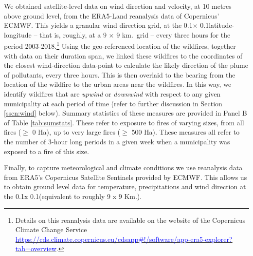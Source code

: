 \documentclass[11pt]{article}
\begin{document}
\begin{spacing}{1.5}
We obtained satellite-level data on wind direction and velocity, at 10 metres above ground level, from the ERA5-Land reanalysis data of Copernicus' ECMWF. This yields a granular wind direction grid, at the 0.1\textdegree $\times$ 0.1\textdegree latitude-longitude -- that is, roughly, at a 9 $\times$ 9 km.\ grid -- every three hours for the period 2003-2018.\footnote{Details on this reanalysis data are available on the website of the Copernicus Climate Change Service \hyperlink{https://cds.climate.copernicus.eu/cdsapp\#!/software/app-era5-explorer?tab=overview}{\textcolor{blue}{https://cds.climate.copernicus.eu/cdsapp\#!/software/app-era5-explorer?tab=overview}}.} Using the geo-referenced location of the wildfires, together with data on their duration span, we linked these wildfires to the coordinates of the closest wind-direction data-point to calculate the likely direction of the plume of pollutants, every three hours. This is then overlaid to the bearing from the location of the wildfire to the urban areas near the wildfires. In this way, we identify wildfires that are \textit{upwind} or \textit{downwind} with respect to any given municipality at each period of time (refer to further discussion in Section \ref{sscn:wind} below). Summary statistics of these measures are provided in Panel B of Table \ref{tab:sumstats}.  These refer to exposure to fires of varying sizes, from all fires ($\geq$ 0 Ha), up to very large fires ($\geq$ 500 Ha).  These measures all refer to the number of 3-hour long periods in a given week when a municipality was exposed to a fire of this size.  

Finally, to capture meteorological and climate conditions we use reanalysis data from ERA5's Copernicus Satellite Sentinels provided by ECMWF. This allows us to obtain ground level data for temperature, precipitations and wind direction at the 0.1\textdegree x 0.1\textdegree (equivalent to roughly 9 x 9 Km.). %





\end{spacing}
\end{document}
